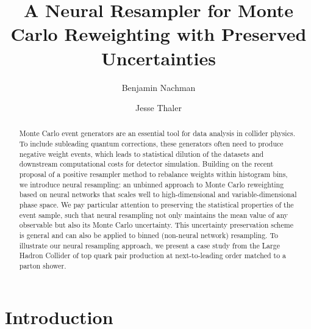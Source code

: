 \documentclass[prd,twocolumn,superscriptaddress,longbibliography,preprintnumbers,floatfix,nofootinbib]{revtex4-1}
\begin{document}
\title{A Neural Resampler for Monte Carlo Reweighting with Preserved Uncertainties}


\author{Benjamin Nachman}

\author{Jesse Thaler}

\begin{abstract}
%
Monte Carlo event generators are an essential tool for data analysis in collider physics.
%
To include subleading quantum corrections, these generators often need to produce negative weight events, which leads to statistical dilution of the datasets and downstream computational costs for detector simulation.
%
Building on the recent proposal of a positive resampler method to rebalance weights within histogram bins, we introduce neural resampling:  an unbinned approach to Monte Carlo reweighting based on neural networks that scales well to high-dimensional and variable-dimensional phase space.
%
We pay particular attention to preserving the statistical properties of the event sample, such that neural resampling not only maintains the mean value of any observable but also its Monte Carlo uncertainty.
%
This uncertainty preservation scheme is general and can also be applied to binned (non-neural network) resampling.
%
To illustrate our neural resampling approach, we present a case study from the Large Hadron Collider of top quark pair production at next-to-leading order matched to a parton shower.
\end{abstract}


\maketitle

\tableofcontents

\section{Introduction}
\end{document}

